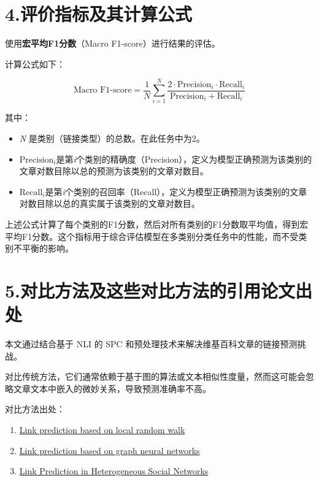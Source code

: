 \documentclass[
]{article}
\begin{document}
\section{4.评价指标及其计算公式}\label{4ux8bc4ux4ef7ux6307ux6807ux53caux5176ux8ba1ux7b97ux516cux5f0f}

使用\textbf{宏平均F1分数}（Macro F1-score）进行结果的评估。

计算公式如下：

\[\text{Macro F1-score} = \frac{1}{N} \sum_{i=1}^{N} \frac{2 \cdot \text{Precision}_i \cdot \text{Recall}_i}{\text{Precision}_i + \text{Recall}_i}\]

其中：

\begin{itemize}
  \item
        \emph{N} 是类别（链接类型）的总数。在此任务中为2。
  \item
        ${\text{Precision}_i}$是第\emph{i}个类别的精确度（Precision），定义为模型正确预测为该类别的文章对数目除以总的预测为该类别的文章对数目。
  \item
        ${\text{Recall}_i}$是第\emph{i}个类别的召回率（Recall），定义为模型正确预测为该类别的文章对数目除以总的真实属于该类别的文章对数目。
\end{itemize}

上述公式计算了每个类别的F1分数，然后对所有类别的F1分数取平均值，得到宏平均F1分数。这个指标用于综合评估模型在多类别分类任务中的性能，而不受类别不平衡的影响。

\section{5.对比方法及这些对比方法的引用论文出处}\label{5ux5bf9ux6bd4ux65b9ux6cd5ux53caux8fd9ux4e9bux5bf9ux6bd4ux65b9ux6cd5ux7684ux5f15ux7528ux8bbaux6587ux51faux5904}

本文通过结合基于 NLI 的 SPC
和预处理技术来解决维基百科文章的链接预测挑战。

对比传统方法，它们通常依赖于基于图的算法或文本相似性度量，然而这可能会忽略文章文本中嵌入的微妙关系，导致预测准确率不高。

对比方法出处：

\begin{enumerate}
  \def\labelenumi{\arabic{enumi}.}
  \item
        \href{https://doi.org/10.48550/arXiv.1001.2467}{Link prediction based
          on local random walk}
  \item
        \href{https://proceedings.neurips.cc/paper_files/paper/2018/file/53f0d7c537d99b3824f0f99d62ea2428-Paper.pdf}{Link
          prediction based on graph neural networks}
  \item
        \href{https://doi.org/10.1145/2983323.2983722}{Link Prediction in
          Heterogeneous Social Networks}
\end{enumerate}
\end{document}

